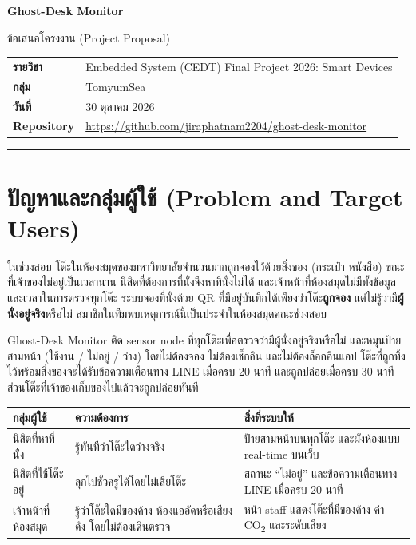 \documentclass[a4paper,11pt]{article}
\begin{document}
{\LARGE\bfseries Ghost-Desk Monitor}\par
\vspace{1pt}
{\color{muted} ข้อเสนอโครงงาน (Project Proposal)}\par
\vspace{4pt}
{\small
\begin{tabular}{@{}>{\bfseries}l l@{}}
รายวิชา & Embedded System (CEDT) Final Project 2026: Smart Devices \\
กลุ่ม & TomyumSea \\
วันที่ & 30 ตุลาคม 2026 \\
Repository & \url{https://github.com/jiraphatnam2204/ghost-desk-monitor} \\
\end{tabular}}
\par\vspace{3pt}\hrule\vspace{2pt}

\section{ปัญหาและกลุ่มผู้ใช้ (Problem and Target Users)}

ในช่วงสอบ โต๊ะในห้องสมุดของมหาวิทยาลัยจำนวนมากถูกจองไว้ด้วยสิ่งของ (กระเป๋า หนังสือ) ขณะที่เจ้าของไม่อยู่เป็นเวลานาน
นิสิตที่ต้องการที่นั่งจึงหาที่นั่งไม่ได้ และเจ้าหน้าที่ห้องสมุดไม่มีทั้งข้อมูลและเวลาในการตรวจทุกโต๊ะ
ระบบจองที่นั่งด้วย QR ที่มีอยู่บันทึกได้เพียงว่าโต๊ะ\textbf{ถูกจอง} แต่ไม่รู้ว่ามี\textbf{ผู้นั่งอยู่จริง}หรือไม่
สมาชิกในทีมพบเหตุการณ์นี้เป็นประจำในห้องสมุดคณะช่วงสอบ

Ghost-Desk Monitor ติด sensor node ที่ทุกโต๊ะเพื่อตรวจว่ามีผู้นั่งอยู่จริงหรือไม่ และหมุนป้ายสามหน้า (ใช้งาน / ไม่อยู่ / ว่าง)
โดยไม่ต้องจอง ไม่ต้องเช็กอิน และไม่ต้องล็อกอินแอป โต๊ะที่ถูกทิ้งไว้พร้อมสิ่งของจะได้รับข้อความเตือนทาง LINE เมื่อครบ 20 นาที
และถูกปล่อยเมื่อครบ 30 นาที ส่วนโต๊ะที่เจ้าของเก็บของไปแล้วจะถูกปล่อยทันที

{\footnotesize
\begin{tabularx}{\linewidth}{@{}P{3.1cm}LL@{}}
\toprule
\textbf{กลุ่มผู้ใช้} & \textbf{ความต้องการ} & \textbf{สิ่งที่ระบบให้} \\
\midrule
นิสิตที่หาที่นั่ง & รู้ทันทีว่าโต๊ะใดว่างจริง & ป้ายสามหน้าบนทุกโต๊ะ และผังห้องแบบ real-time บนเว็บ \\
นิสิตที่ใช้โต๊ะอยู่ & ลุกไปชั่วครู่ได้โดยไม่เสียโต๊ะ & สถานะ ``ไม่อยู่'' และข้อความเตือนทาง LINE เมื่อครบ 20 นาที \\
เจ้าหน้าที่ห้องสมุด & รู้ว่าโต๊ะใดมีของค้าง ห้องแออัดหรือเสียงดัง โดยไม่ต้องเดินตรวจ & หน้า staff แสดงโต๊ะที่มีของค้าง ค่า CO\textsubscript{2} และระดับเสียง \\
\bottomrule
\end{tabularx}}
\end{document}
